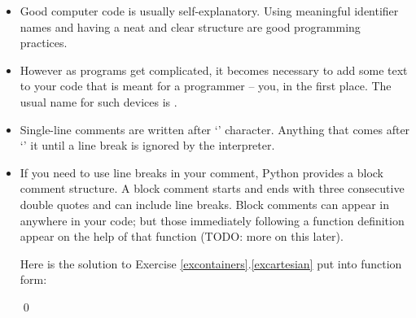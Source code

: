 \documentclass[a4paper]{article}
\begin{document}
\begin{itemize}

\item Good computer code is usually self-explanatory. Using meaningful identifier
names and having a neat and clear structure are good programming practices. 

\item However as programs get complicated, it becomes necessary to add some text
to your  code that is meant for a programmer -- you, in the first place. The
usual name for such devices is .

\item Single-line comments are written after `\pyv{#}' character.
Anything that comes after `\pyv{#}' it until a line break is ignored by the interpreter.

\begin{ucodeframe}
\end{ucodeframe}

\item If you need to use line breaks in your comment, Python provides a block
comment structure. A block comment starts and ends with three consecutive
double quotes and can include line breaks. Block comments can appear in anywhere
in your code; but those immediately following a function definition appear on
the help of that function (TODO: more on this later). 

\begin{uexample}
Here is the solution to
Exercise \ref{excontainers}.\ref{excartesian} put into function form:
\begin{ucodeframe}
\end{ucodeframe}

\qed
\end{uexample}


\end{itemize}
\end{document}
